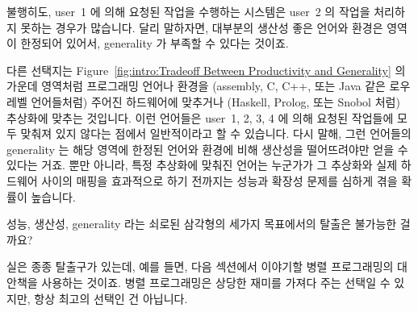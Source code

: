 불행히도, user~1 에 의해 요청된 작업을 수행하는 시스템은 user~2 의 작업을
처리하지 못하는 경우가 많습니다.
달리 말하자면, 대부분의 생산성 좋은 언어와 환경은 영역이 한정되어 있어서,
generality 가 부족할 수 있다는 것이죠.

다른 선택지는
Figure~\ref{fig:intro:Tradeoff Between Productivity and Generality} 의 가운데
영역처럼 프로그래밍 언어나 환경을 (assembly, C, C++, 또는 Java 같은 로우 레벨
언어들처럼) 주어진 하드웨어에 맞추거나 (Haskell, Prolog, 또는 Snobol 처럼)
추상화에 맞추는 것입니다.
이런 언어들은 user~1, 2, 3, 4 에 의해 요청된 작업들에 모두 맞춰져 있지 않다는
점에서 일반적이라고 할 수 있습니다.
다시 말해, 그런 언어들의 generality 는 해당 영역에 한정된 언어와 환경에 비해
생산성을 떨어뜨려야만 얻을 수 있다는 거죠.
뿐만 아니라, 특정 추상화에 맞춰진 언어는 누군가가 그 추상화와 실제 하드웨어
사이의 매핑을 효과적으로 하기 전까지는 성능과 확장성 문제를 심하게 겪을 확률이
높습니다.

성능, 생산성, generality 라는 쇠로된 삼각형의 세가지 목표에서의 탈출은 불가능한
걸까요?

실은 종종 탈출구가 있는데, 예를 들면, 다음 섹션에서 이야기할 병렬 프로그래밍의
대안책을 사용하는 것이죠.
병렬 프로그래밍은 상당한 재미를 가져다 주는 선택일 수 있지만, 항상 최고의
선택인 건 아닙니다.
\iffalse

